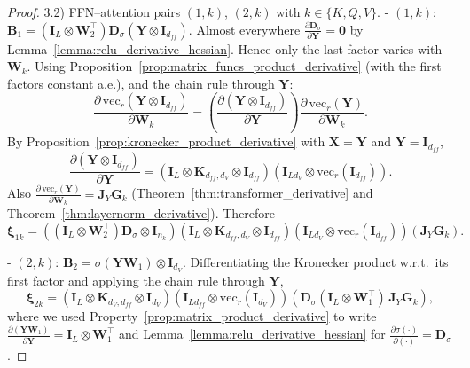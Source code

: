 \documentclass{article}
\begin{document}
\begin{proof}
3.2) FFN–attention pairs $(1,k)$, $(2,k)$ with $k \in \{K,Q,V\}$.
- $(1,k)$: $\mathbf{B}_1 = (\mathbf{I}_L \otimes \mathbf{W}_2^\top) \mathbf{D}_\sigma (\mathbf{Y} \otimes \mathbf{I}_{d_{ff}})$. Almost everywhere $\frac{\partial \mathbf{D}_\sigma}{\partial \mathbf{Y}}=\mathbf{0}$ by Lemma~\ref{lemma:relu_derivative_hessian}. Hence only the last factor varies with $\mathbf{W}_k$. Using Proposition~\ref{prop:matrix_funcs_product_derivative} (with the first factors constant a.e.), and the chain rule through $\mathbf{Y}$:
\[
\frac{\partial\,\mathrm{vec}_r(\mathbf{Y} \otimes \mathbf{I}_{d_{ff}})}{\partial \mathbf{W}_k}
= \left( \frac{\partial (\mathbf{Y} \otimes \mathbf{I}_{d_{ff}})}{\partial \mathbf{Y}} \right) \frac{\partial \,\mathrm{vec}_r(\mathbf{Y})}{\partial \mathbf{W}_k}.
\]
By Proposition~\ref{prop:kronecker_product_derivative} with $\mathbf{X} = \mathbf{Y}$ and $\mathbf{Y}=\mathbf{I}_{d_{ff}}$,
\[\frac{\partial (\mathbf{Y} \otimes \mathbf{I}_{d_{ff}})}{\partial \mathbf{Y}} = \left( \mathbf{I}_L \otimes \mathbf{K}_{d_{ff}, d_V} \otimes \mathbf{I}_{d_{ff}} \right)\left( \mathbf{I}_{L d_V} \otimes \mathrm{vec}_r(\mathbf{I}_{d_{ff}}) \right).\]
Also $\frac{\partial \,\mathrm{vec}_r(\mathbf{Y})}{\partial \mathbf{W}_k} = \mathbf{J}_Y \mathbf{G}_k$ (Theorem~\ref{thm:transformer_derivative} and Theorem~\ref{thm:layernorm_derivative}). Therefore
\[\boldsymbol{\xi}_{1k} = \left( (\mathbf{I}_L \otimes \mathbf{W}_2^\top) \mathbf{D}_\sigma \otimes \mathbf{I}_{n_k}\right)\left( \mathbf{I}_L \otimes \mathbf{K}_{d_{ff}, d_V} \otimes \mathbf{I}_{d_{ff}} \right)\left( \mathbf{I}_{L d_V} \otimes \mathrm{vec}_r(\mathbf{I}_{d_{ff}}) \right) \left( \mathbf{J}_Y \mathbf{G}_k \right).\]

- $(2,k)$: $\mathbf{B}_2 = \sigma(\mathbf{Y}\mathbf{W}_1) \otimes \mathbf{I}_{d_V}$. Differentiating the Kronecker product w.r.t.\ its first factor and applying the chain rule through $\mathbf{Y}$,
\[\boldsymbol{\xi}_{2k} = \left( \mathbf{I}_L \otimes \mathbf{K}_{d_V, d_{ff}} \otimes \mathbf{I}_{d_V} \right)\left( \mathbf{I}_{L d_{ff}} \otimes \mathrm{vec}_r(\mathbf{I}_{d_V}) \right)\left( \mathbf{D}_\sigma (\mathbf{I}_L \otimes \mathbf{W}_1^\top) \, \mathbf{J}_Y \mathbf{G}_k \right),\]
where we used Property~\ref{prop:matrix_product_derivative} to write $\frac{\partial (\mathbf{Y}\mathbf{W}_1)}{\partial \mathbf{Y}} = \mathbf{I}_L \otimes \mathbf{W}_1^\top$ and Lemma~\ref{lemma:relu_derivative_hessian} for $\frac{\partial \sigma(\cdot)}{\partial (\cdot)} = \mathbf{D}_\sigma$.


\end{proof}
\end{document}
